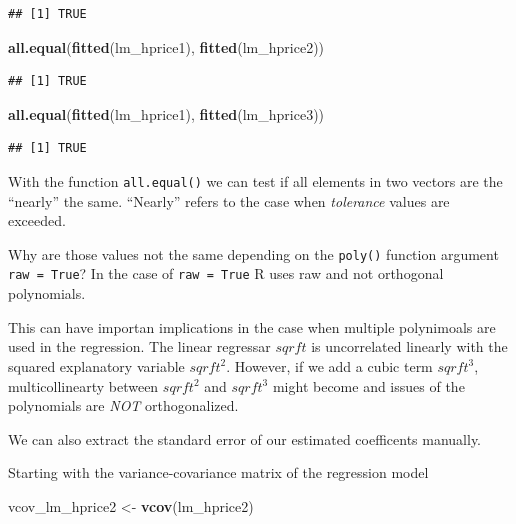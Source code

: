 \documentclass[]{book}
\newenvironment{Shaded}{\begin{snugshade}}{\end{snugshade}}
\newcommand{\KeywordTok}[1]{\textcolor[rgb]{0.13,0.29,0.53}{\textbf{#1}}}
\newcommand{\NormalTok}[1]{#1}
\newcommand{\StringTok}[1]{\textcolor[rgb]{0.31,0.60,0.02}{#1}}
\begin{document}
\begin{verbatim}
## [1] TRUE
\end{verbatim}

\begin{Shaded}
\begin{Highlighting}[]
\KeywordTok{all.equal}\NormalTok{(}\KeywordTok{fitted}\NormalTok{(lm_hprice1), }\KeywordTok{fitted}\NormalTok{(lm_hprice2))}
\end{Highlighting}
\end{Shaded}

\begin{verbatim}
## [1] TRUE
\end{verbatim}

\begin{Shaded}
\begin{Highlighting}[]
\KeywordTok{all.equal}\NormalTok{(}\KeywordTok{fitted}\NormalTok{(lm_hprice1), }\KeywordTok{fitted}\NormalTok{(lm_hprice3))}
\end{Highlighting}
\end{Shaded}

\begin{verbatim}
## [1] TRUE
\end{verbatim}

With the function \texttt{all.equal()} we can test if all elements in two vectors are the ``nearly'' the same. ``Nearly'' refers to the case when \emph{tolerance} values are exceeded.

Why are those values not the same depending on the \texttt{poly()} function argument \texttt{raw\ =\ True}? In the case of \texttt{raw\ =\ True} R uses raw and not orthogonal polynomials.

This can have importan implications in the case when multiple polynimoals are used in the regression. The linear regressar \(sqrft\) is uncorrelated linearly with the squared explanatory variable \(sqrft^2\). However, if we add a cubic term \(sqrft^3\), multicollinearty between \(sqrft^2\) and \(sqrft^3\) might become and issues of the polynomials are \emph{NOT} orthogonalized.

We can also extract the standard error of our estimated coefficents manually.

Starting with the variance-covariance matrix of the regression model

\begin{Shaded}
\begin{Highlighting}[]
\NormalTok{vcov_lm_hprice2 <-}\StringTok{ }\KeywordTok{vcov}\NormalTok{(lm_hprice2)}
\end{Highlighting}
\end{Shaded}
\end{document}
